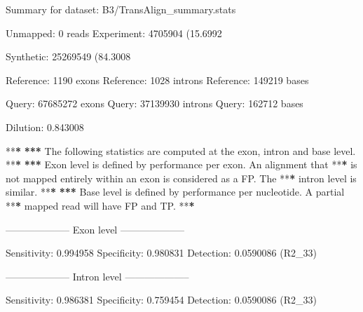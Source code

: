 \documentclass[]{article}
\newenvironment{Shaded}{\begin{snugshade}}{\end{snugshade}}
\newcommand{\DecValTok}[1]{\textcolor[rgb]{0.00,0.00,0.81}{{#1}}}
\newcommand{\FloatTok}[1]{\textcolor[rgb]{0.00,0.00,0.81}{{#1}}}
\newcommand{\StringTok}[1]{\textcolor[rgb]{0.31,0.60,0.02}{{#1}}}
\newcommand{\ErrorTok}[1]{\textbf{{#1}}}
\newcommand{\NormalTok}[1]{{#1}}
\begin{document}
\begin{Shaded}
\begin{Highlighting}[]
\NormalTok{Summary for dataset:}\StringTok{ }\NormalTok{B3/TransAlign_summary.stats}

   \NormalTok{Unmapped:}\StringTok{   }\DecValTok{0} \NormalTok{reads}
   \NormalTok{Experiment:}\StringTok{ }\DecValTok{4705904} \NormalTok{(}\FloatTok{15.6992}\NormalTok{%
   \NormalTok{Synthetic:}\StringTok{  }\DecValTok{25269549} \NormalTok{(}\FloatTok{84.3008}\NormalTok{%

   \NormalTok{Reference:}\StringTok{  }\DecValTok{1190} \NormalTok{exons}
   \NormalTok{Reference:}\StringTok{  }\DecValTok{1028} \NormalTok{introns}
   \NormalTok{Reference:}\StringTok{  }\DecValTok{149219} \NormalTok{bases}

   \NormalTok{Query:}\StringTok{      }\DecValTok{67685272} \NormalTok{exons}
   \NormalTok{Query:}\StringTok{      }\DecValTok{37139930} \NormalTok{introns}
   \NormalTok{Query:}\StringTok{      }\DecValTok{162712} \NormalTok{bases}

   \NormalTok{Dilution:}\StringTok{   }\FloatTok{0.843008}

   \NormalTok{**}\ErrorTok{*}
\StringTok{   }\ErrorTok{***}\StringTok{ }\NormalTok{The following statistics are computed at the exon, intron and base level.}
   \NormalTok{**}\ErrorTok{*}
\StringTok{   }\ErrorTok{***}\StringTok{ }\NormalTok{Exon level is defined by performance per exon. An alignment that}
   \NormalTok{**}\ErrorTok{*}\StringTok{ }\NormalTok{is not mapped entirely within an exon is considered as a FP. The}
   \NormalTok{**}\ErrorTok{*}\StringTok{ }\NormalTok{intron level is similar.}
   \NormalTok{**}\ErrorTok{*}
\StringTok{   }\ErrorTok{***}\StringTok{ }\NormalTok{Base level is defined by performance per nucleotide. A partial}
   \NormalTok{**}\ErrorTok{*}\StringTok{ }\NormalTok{mapped read will have FP and TP.}
   \NormalTok{**}\ErrorTok{*}

\StringTok{   }\NormalTok{--------------------}\StringTok{ }\NormalTok{Exon level --------------------}

\StringTok{   }\NormalTok{Sensitivity:}\StringTok{ }\FloatTok{0.994958}
   \NormalTok{Specificity:}\StringTok{ }\FloatTok{0.980831}
   \NormalTok{Detection:}\StringTok{   }\FloatTok{0.0590086} \NormalTok{(R2_33)}

   \NormalTok{--------------------}\StringTok{ }\NormalTok{Intron level --------------------}

\StringTok{   }\NormalTok{Sensitivity:}\StringTok{ }\FloatTok{0.986381}
   \NormalTok{Specificity:}\StringTok{ }\FloatTok{0.759454}
   \NormalTok{Detection:}\StringTok{   }\FloatTok{0.0590086} \NormalTok{(R2_33)}

}}
\end{Highlighting}
\end{Shaded}
\end{document}
